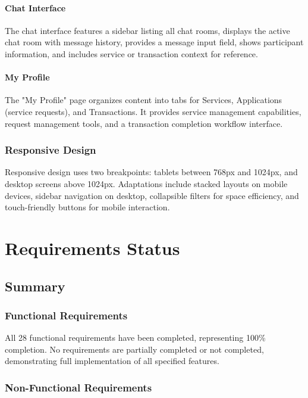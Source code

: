 \documentclass[12pt,a4paper]{report}
\begin{document}
\subsubsection{Chat Interface}

The chat interface features a sidebar listing all chat rooms, displays the active chat room with message history, provides a message input field, shows participant information, and includes service or transaction context for reference.

\subsubsection{My Profile}

The "My Profile" page organizes content into tabs for Services, Applications (service requests), and Transactions. It provides service management capabilities, request management tools, and a transaction completion workflow interface.

\subsection{Responsive Design}

Responsive design uses two breakpoints: tablets between 768px and 1024px, and desktop screens above 1024px. Adaptations include stacked layouts on mobile devices, sidebar navigation on desktop, collapsible filters for space efficiency, and touch-friendly buttons for mobile interaction.

\chapter{Requirements Status}

\section{Summary}

\subsection{Functional Requirements}

All 28 functional requirements have been completed, representing 100\% completion. No requirements are partially completed or not completed, demonstrating full implementation of all specified features.

\subsection{Non-Functional Requirements}
\end{document}
